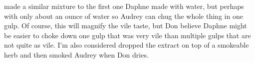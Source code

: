 \documentclass[12pt]{book}
\begin{document}
made a similar mixture to the first one Daphne made with water, but perhaps with only about an ounce of water so Audrey can chug the whole thing in one gulp. Of course, this will magnify the vile taste, but Don believe Daphne might be easier to choke down one gulp that was very vile than multiple gulps that are not quite as vile. I'm also considered dropped the extract on top of a smokeable herb and then smoked Audrey when Don dries.
\end{document}

